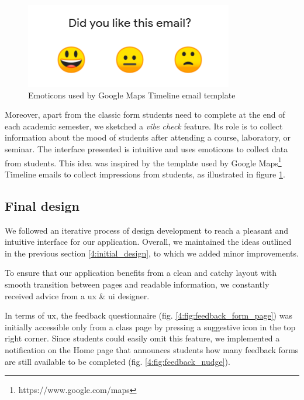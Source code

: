     \begin{figure}
            \centering
            \includegraphics[width=0.42\columnwidth]{figures/google_emoticons.png}
            \captionsetup{labelsep=space, textformat=empty}
            \caption{Emoticons used by Google Maps Timeline email template}
            \label{4:fig:google_emoticons}
    \end{figure}
    
    Moreover, apart from the classic form students need to complete at the end of each academic semester, we sketched a \textit{vibe check} feature. Its role is to collect information about the mood of students after attending a course, laboratory, or seminar. The interface presented is intuitive and uses emoticons to collect data from students. This idea was inspired by the template used by Google Maps\footnote{https://www.google.com/maps} Timeline emails to collect impressions from students, as illustrated in figure \ref{4:fig:google_emoticons}.
    
    \subsection{Final design} \label{4:final_design}
    
    We followed an iterative process of design development to reach a pleasant and intuitive interface for our application. Overall, we maintained the ideas outlined in the previous section \ref{4:initial_design}, to which we added minor improvements.
    
    To ensure that our application benefits from a clean and catchy layout with smooth transition between pages and readable information, we constantly received advice from a \acrshort{ux} \& \acrshort{ui} designer.
    
    In terms of \acrshort{ux}, the feedback questionnaire (fig. \ref{4:fig:feedback_form_page}) was initially accessible only from a class page by pressing a suggestive icon in the top right corner. Since students could easily omit this feature, we implemented a notification on the Home page that announces students how many feedback forms are still available to be completed (fig. \ref{4:fig:feedback_nudge}).
    
